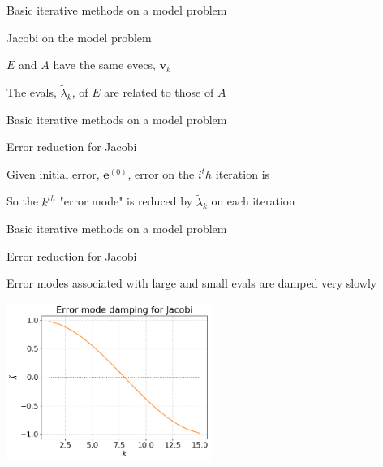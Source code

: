 \documentclass[18pt,xcolor=table]{beamer}
\begin{document}
\begin{frame}{Basic iterative methods on a model problem}
\begin{block}{Jacobi on the model problem}
\bit
\item $E$ and $A$ have the same evecs, $\mathbf{v}_k$
\item The evals, $\tilde\lambda_k$, of $E$ are related to those of $A$ 
\eit
\end{block}
\end{frame}


\begin{frame}{Basic iterative methods on a model problem}
\begin{block}{Error reduction for Jacobi}
\bit
\item Given initial error, $\mathbf{e}^{(0)}$, error on the $i^th$ iteration is 
\item So the $k^{th}$ "error mode" is reduced by $\tilde\lambda_k$ on each iteration
\eit
\end{block}
\end{frame}

\begin{frame}{Basic iterative methods on a model problem}
\begin{block}{Error reduction for Jacobi}
\bit
\item Error modes associated with large and small evals are damped very slowly
\eit
\end{block}
\begin{center}
\includegraphics[width=0.5\textwidth]{../figures/jacobiModeDamping}
\end{center}
\end{frame}
\end{document}
